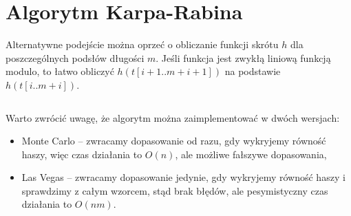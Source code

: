 \section{Algorytm Karpa-Rabina}

Alternatywne podejście można oprzeć o obliczanie funkcji skrótu $h$ dla poszczególnych podsłów długości $m$. Jeśli funkcja jest zwykłą liniową funkcją modulo, to łatwo obliczyć $h(t[i + 1..m + i + 1])$ na podstawie $h(t[i..m + i])$.

\begin{code}
\inputminted{python}{code/exact-string-matching/karp-rabin.py}
\label{alg:exact-string-matching-karp-rabin}
\end{code}

Warto zwrócić uwagę, że algorytm można zaimplementować w dwóch wersjach:
\begin{itemize}
    \item Monte Carlo -- zwracamy dopasowanie od razu, gdy wykryjemy równość haszy, więc czas działania to $O(n)$, ale możliwe fałszywe dopasowania,
    \item Las Vegas -- zwracamy dopasowanie jedynie, gdy wykryjemy równość haszy i sprawdzimy z całym wzorcem, stąd brak błędów, ale pesymistyczny czas działania to $O(n m)$.
\end{itemize}